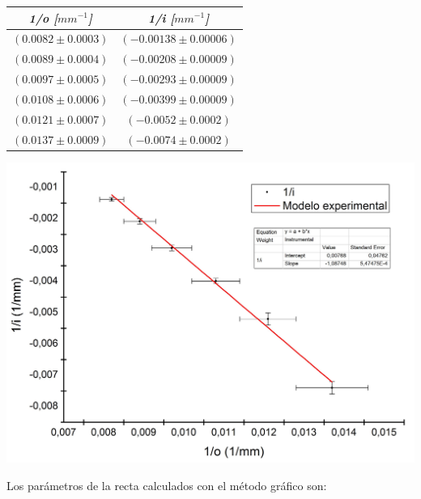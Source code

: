 \documentclass[a4paper,12pt]{article}
\newenvironment{Figure}
  {\par\medskip\noindent\minipage{\linewidth}}
  {\endminipage\par\medskip}
\begin{document}
\begin{multicols*}{2}
\begin{Figure}
            \begin{tabular}{cc}
                \toprule
                \textit{\textbf{1/o [$mm^{-1}$]}} & \textit{\textbf{1/i [$mm^{-1}$]}} \\
                \midrule
                $(0.0082 \pm 0.0003)$ & $(-0.00138 \pm 0.00006)$ \\
                $(0.0089 \pm 0.0004)$ & $(-0.00208 \pm 0.00009)$ \\
                $(0.0097 \pm 0.0005)$ & $(-0.00293 \pm 0.00009)$ \\
                $(0.0108 \pm 0.0006)$ & $(-0.00399 \pm 0.00009)$ \\
                $(0.0121 \pm 0.0007)$ & $(-0.0052 \pm 0.0002)$ \\
                $(0.0137 \pm 0.0009)$ & $(-0.0074 \pm 0.0002)$ \\
                \bottomrule 
            \end{tabular}

            \label{tab:Datosdiverinv}
        \end{Figure}

        \begin{Figure}
            \centering
            \includegraphics[width=1\linewidth]{Lente divergente.jpg}
            \label{fig:Lentediv}
        \end{Figure}

        Los parámetros de la recta calculados con el método gráfico son: 


\end{multicols*}
\end{document}
